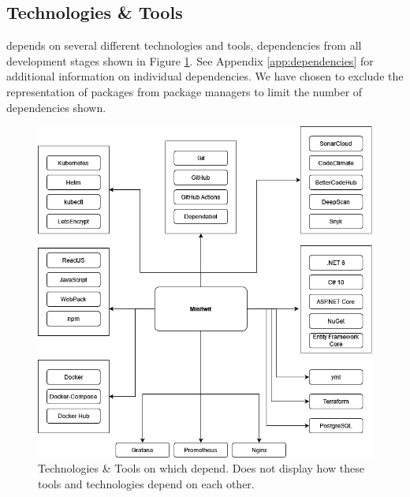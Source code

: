\subsection{Technologies \& Tools}
\label{subsec:techs}
\mini depends on several different technologies and tools, dependencies from all development stages shown in Figure \ref{fig:dependencies}. See Appendix \ref{app:dependencies} for additional information on individual dependencies. We have chosen to exclude the representation of packages from package managers to limit the number of dependencies shown.
\begin{figure}[H]
    \centering
    \includegraphics[scale=0.45]{images/DevopsDiagrams-Dependency.drawio(1).png}
    \caption{Technologies \& Tools on which \mini depend. Does not display how these tools and technologies depend on each other.}
    \label{fig:dependencies}
\end{figure}


